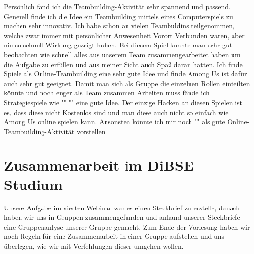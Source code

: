 \documentclass[12pt]{article}
\begin{document}
Persönlich fand ich die Teambuilding-Aktivität sehr spannend und passend. Generell finde ich die Idee ein Teambuilding mittels eines Computerspiels zu machen sehr innovativ. Ich habe schon an vielen Teambuldins teilgenommen, welche zwar immer mit persönlicher Anwesenheit Vorort Verbunden waren, aber nie so schnell Wirkung gezeigt haben. Bei diesem Spiel konnte man sehr gut beobachten wie schnell alles aus unserem Team zusammengearbeitet haben um die Aufgabe zu erfüllen und aus meiner Sicht auch Spaß daran hatten. Ich finde Spiele als Online-Teambuilding eine sehr gute Idee und finde Among Us ist dafür auch sehr gut geeignet. Damit man sich als Gruppe die einzelnen Rollen einteilten könnte und noch enger als Team zusammen Arbeiten muss fände ich Strategiespiele wie ""  "" eine gute Idee. Der einzige Hacken an diesen Spielen ist es, dass diese nicht Kostenlos sind und man diese auch nicht so einfach wie Among Us online spielen kann. Ansonsten könnte ich mir noch "" als gute Online-Teambuilding-Aktivität vorstellen.
\section{Zusammenarbeit im DiBSE Studium}
Unsere Aufgabe im vierten Webinar war es einen Steckbrief zu erstelle, danach haben wir uns in Gruppen zusammengefunden und anhand unserer Steckbriefe eine Gruppenanlyse unserer Gruppe gemacht. Zum Ende der Vorlesung haben wir noch Regeln für eine Zusammenarbeit in einer Gruppe aufstellen und uns überlegen, wie wir mit Verfehlungen dieser umgehen wollen.
\end{document}
